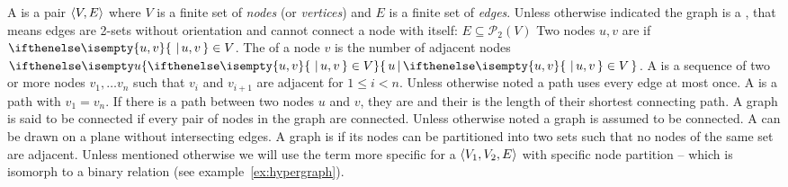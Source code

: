 A  is a pair $\langle V,E \rangle$ where $V$ is a finite set of
\textit{nodes}  (or \textit{vertices})
 and $E$ is a finite set of \textit{edges}.
Unless otherwise indicated the graph is a , that means edges 
are 2-sets without orientation and cannot connect a node with itself:
$E \subseteq \mathcal{P}_{2}(V)$ Two nodes $u,v$ are  if
$\set{u,v} \in V$. The  of a node $v$ is the number of adjacent
nodes $\set[u]{\set{u,v} \in V}$. A  is a sequence of two or more
nodes $v_1,\ldots v_n$ such that $v_i$ and $v_{i+1}$ are adjacent for 
$1 \le i < n$. Unless otherwise noted a path uses every edge at most once. 
A  is a path with $v_1=v_n$. If there is a path between two nodes
$u$ and $v$, they are  and their  is the length
of their shortest connecting path. A graph is said to be connected if every pair
of nodes in the graph are connected. Unless otherwise noted a graph is
assumed to be connected. A  can be drawn on a plane without
intersecting edges. A graph is  if its nodes
can be partitioned into two sets such that no nodes of the same set are
adjacent. Unless mentioned otherwise we will use the term  more specific for a  $\langle V_1,V_2,E \rangle$ with
specific node partition -- which is isomorph to a binary relation (see 
example~\ref{ex:hypergraph}).

